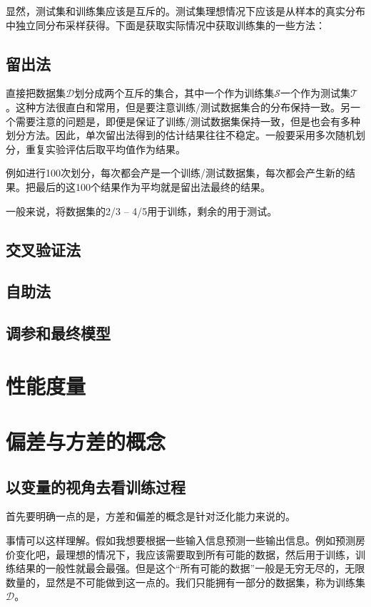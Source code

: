 \documentclass[12pt, letterpaper]{article}
\begin{document}
显然，测试集和训练集应该是互斥的。测试集理想情况下应该是从样本的真实分布中独立同分布采样获得。下面是获取实际情况中获取训练集的一些方法：

\subsection{留出法}
直接把数据集$\mathcal{D}$划分成两个互斥的集合，其中一个作为训练集$\mathcal{S}$一个作为测试集$\mathcal{T}$。这种方法很直白和常用，但是要注意训练/测试数据集合的分布保持一致。另一个需要注意的问题是，即便是保证了训练/测试数据集保持一致，但是也会有多种划分方法。因此，单次留出法得到的估计结果往往不稳定。一般要采用多次随机划分，重复实验评估后取平均值作为结果。

例如进行100次划分，每次都会产是一个训练/测试数据集，每次都会产生新的结果。把最后的这100个结果作为平均就是留出法最终的结果。

一般来说，将数据集的2/3 -- 4/5用于训练，剩余的用于测试。
\subsection{交叉验证法}

\subsection{自助法}

\subsection{调参和最终模型}


\section{性能度量}



\section{偏差与方差的概念}
\subsection{以变量的视角去看训练过程}

首先要明确一点的是，方差和偏差的概念是针对泛化能力来说的。

事情可以这样理解。假如我想要根据一些输入信息预测一些输出信息。例如预测房价变化吧，最理想的情况下，我应该需要取到所有可能的数据，然后用于训练，训练结果的一般性就最会最强。但是这个“所有可能的数据”一般是无穷无尽的，无限数量的，显然是不可能做到这一点的。我们只能拥有一部分的数据集，称为训练集$\mathcal{D}$。
\end{document}
